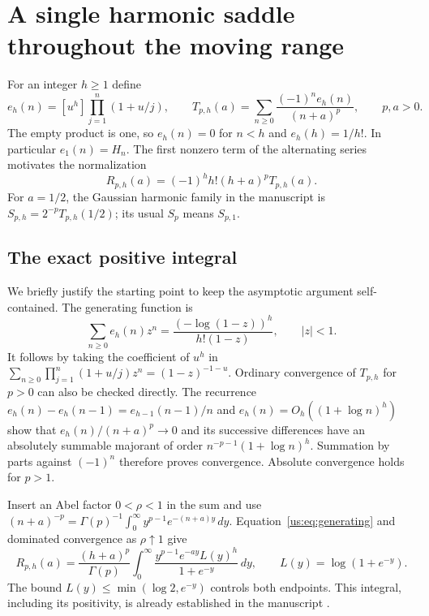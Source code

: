 \section{A single harmonic saddle throughout the moving range}
\label{us:sec:uniform}

For an integer $h\ge1$ define
\[
 e_h(n)=[u^h]\prod_{j=1}^n(1+u/j),\qquad
 T_{p,h}(a)=\sum_{n\ge0}\frac{(-1)^ne_h(n)}{(n+a)^p},
 \qquad p,a>0.
\]
The empty product is one, so $e_h(n)=0$ for $n<h$ and
$e_h(h)=1/h!$. In particular $e_1(n)=H_n$. The first nonzero
term of the alternating series motivates the normalization
\begin{equation}\label{us:eq:R}
 R_{p,h}(a)=(-1)^hh!(h+a)^pT_{p,h}(a).
\end{equation}
For $a=1/2$, the Gaussian harmonic family in the manuscript is
$S_{p,h}=2^{-p}T_{p,h}(1/2)$; its usual $S_p$ means $S_{p,1}$.

\subsection{The exact positive integral}

We briefly justify the starting point to keep the asymptotic argument
self-contained. The generating function is
\begin{equation}\label{us:eq:generating}
 \sum_{n\ge0}e_h(n)z^n
 =\frac{(-\log(1-z))^h}{h!(1-z)},\qquad |z|<1.
\end{equation}
It follows by taking the coefficient of $u^h$ in
$\sum_{n\ge0}\prod_{j=1}^n(1+u/j)z^n=(1-z)^{-1-u}$.
Ordinary convergence of $T_{p,h}$ for $p>0$ can also be checked
directly. The recurrence
$e_h(n)-e_h(n-1)=e_{h-1}(n-1)/n$ and
$e_h(n)=O_h((1+\log n)^h)$ show that
$e_h(n)/(n+a)^p\to0$ and its successive differences have an
absolutely summable majorant of order
$n^{-p-1}(1+\log n)^h$. Summation by parts against $(-1)^n$
therefore proves convergence. Absolute convergence holds for $p>1$.

Insert an Abel factor $0<\rho<1$ in the sum and use
$(n+a)^{-p}=\Gamma(p)^{-1}\int_0^\infty y^{p-1}e^{-(n+a)y}\,dy$.
Equation~\eqref{us:eq:generating} and dominated convergence as
$\rho\uparrow1$ give
\begin{equation}\label{us:eq:integral}
 R_{p,h}(a)=\frac{(h+a)^p}{\Gamma(p)}
 \int_0^\infty
  \frac{y^{p-1}e^{-ay}L(y)^h}{1+e^{-y}}\,dy,
 \qquad L(y)=\log(1+e^{-y}).
\end{equation}
The bound $L(y)\le\min(\log2,e^{-y})$ controls both endpoints.
This integral, including its positivity, is already established in
the manuscript \cite[,
]{cont:ProveIt}.

